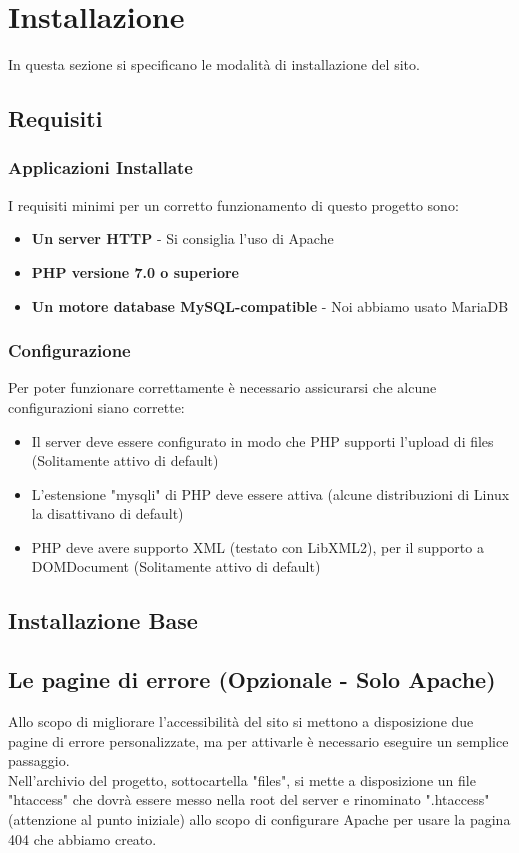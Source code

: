\section{Installazione}
In questa sezione si specificano le modalità di installazione del sito.

\subsection{Requisiti}
\subsubsection{Applicazioni Installate}
I requisiti minimi per un corretto funzionamento di questo progetto sono:
\begin{itemize}
\item \textbf{Un server HTTP} - Si consiglia l'uso di Apache
\item \textbf{PHP versione 7.0 o superiore}
\item \textbf{Un motore database MySQL-compatible} - Noi abbiamo usato MariaDB
\end{itemize}
\subsubsection{Configurazione}
Per poter funzionare correttamente è necessario assicurarsi che alcune configurazioni siano corrette:
\begin{itemize}
\item Il server deve essere configurato in modo che PHP supporti l'upload di files (Solitamente attivo di default)
\item L'estensione "mysqli" di PHP deve essere attiva (alcune distribuzioni di Linux la disattivano di default)
\item PHP deve avere supporto XML (testato con LibXML2), per il supporto a DOMDocument (Solitamente attivo di default)
\end{itemize}

\subsection{Installazione Base}

\subsection{Le pagine di errore (Opzionale - Solo Apache)}
Allo scopo di migliorare l'accessibilità del sito si mettono a disposizione due pagine di errore personalizzate, ma per attivarle è necessario eseguire un semplice passaggio.\\
Nell'archivio del progetto, sottocartella "files", si mette a disposizione un file "htaccess" che dovrà essere messo nella root del server e rinominato ".htaccess" (attenzione al punto iniziale) allo scopo di configurare Apache per usare la pagina 404 che abbiamo creato.
